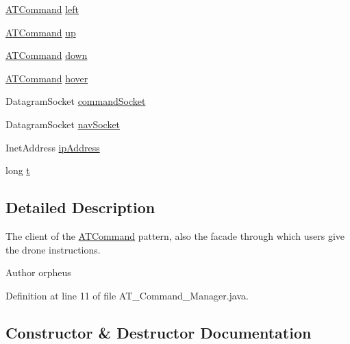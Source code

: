 \begin{DoxyCompactItemize}
\item 
\hyperlink{interface_drone_1_1_drone_commands_1_1_a_t_command}{A\+T\+Command} \hyperlink{class_drone_1_1_drone_commands_1_1_a_t___command___manager_a0c85483dd42046af9882d140f8eb9d12}{left}
\item 
\hyperlink{interface_drone_1_1_drone_commands_1_1_a_t_command}{A\+T\+Command} \hyperlink{class_drone_1_1_drone_commands_1_1_a_t___command___manager_a2a050072c86dfbd84ee82696b59d366e}{up}
\item 
\hyperlink{interface_drone_1_1_drone_commands_1_1_a_t_command}{A\+T\+Command} \hyperlink{class_drone_1_1_drone_commands_1_1_a_t___command___manager_a76f949b34a87e8577a41c02f410b97cc}{down}
\item 
\hyperlink{interface_drone_1_1_drone_commands_1_1_a_t_command}{A\+T\+Command} \hyperlink{class_drone_1_1_drone_commands_1_1_a_t___command___manager_aafd47053f06ac149caa6e349f67906fb}{hover}
\item 
Datagram\+Socket \hyperlink{class_drone_1_1_drone_commands_1_1_a_t___command___manager_a6fc16b3f0b9db4ede77841c18c84cab0}{command\+Socket}
\item 
Datagram\+Socket \hyperlink{class_drone_1_1_drone_commands_1_1_a_t___command___manager_a09258643671eccda829e54409d25e14c}{nav\+Socket}
\item 
Inet\+Address \hyperlink{class_drone_1_1_drone_commands_1_1_a_t___command___manager_a69120034be279656eb27b5d321fe3f04}{ip\+Address}
\item 
long \hyperlink{class_drone_1_1_drone_commands_1_1_a_t___command___manager_ae17b2729d7c785eebb2af3ada7069efe}{t}
\end{DoxyCompactItemize}


\subsection{Detailed Description}
The client of the \hyperlink{interface_drone_1_1_drone_commands_1_1_a_t_command}{A\+T\+Command} pattern, also the facade through which users give the drone instructions. \begin{DoxyAuthor}{Author}
orpheus 
\end{DoxyAuthor}


Definition at line 11 of file A\+T\+\_\+\+Command\+\_\+\+Manager.\+java.



\subsection{Constructor \& Destructor Documentation}
\hypertarget{class_drone_1_1_drone_commands_1_1_a_t___command___manager_afcbb9940f1139a33dcd91cc906017c67}{}
